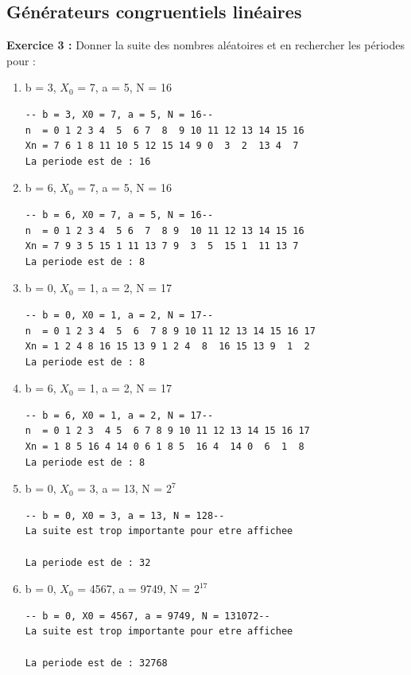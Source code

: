 \documentclass[oneside]{book}
\begin{document}
\subsection{Générateurs congruentiels linéaires}
\textbf{Exercice 3 :}
Donner la suite des nombres aléatoires et en rechercher les périodes pour : 
\begin{enumerate}
	\item b = 3, $X_0$ = 7, a = 5, N = 16 
	\begin{lstlisting}[frame=single]
	-- b = 3, X0 = 7, a = 5, N = 16--
n  = 0 1 2 3 4  5  6 7  8  9 10 11 12 13 14 15 16 
Xn = 7 6 1 8 11 10 5 12 15 14 9 0  3  2  13 4  7 
La periode est de : 16
\end{lstlisting}
	\item b = 6, $X_0$ = 7, a = 5, N = 16 
	\begin{lstlisting}[frame=single]
	-- b = 6, X0 = 7, a = 5, N = 16--
n  = 0 1 2 3 4  5 6  7  8 9  10 11 12 13 14 15 16 
Xn = 7 9 3 5 15 1 11 13 7 9  3  5  15 1  11 13 7 
La periode est de : 8

	\end{lstlisting}
	\item b = 0, $X_0$ = 1, a = 2, N = 17 
	\begin{lstlisting}[frame=single]
	-- b = 0, X0 = 1, a = 2, N = 17--
n  = 0 1 2 3 4  5  6  7 8 9 10 11 12 13 14 15 16 17 
Xn = 1 2 4 8 16 15 13 9 1 2 4  8  16 15 13 9  1  2 
La periode est de : 8
	\end{lstlisting}
	\item b = 6, $X_0$ = 1, a = 2, N = 17 
	\begin{lstlisting}[frame=single]
	-- b = 6, X0 = 1, a = 2, N = 17--
n  = 0 1 2 3  4 5  6 7 8 9 10 11 12 13 14 15 16 17 
Xn = 1 8 5 16 4 14 0 6 1 8 5  16 4  14 0  6  1  8 
La periode est de : 8

	\end{lstlisting}
	\item b = 0, $X_0$ = 3, a = 13, N = $2^7$ 
	\begin{lstlisting}[frame=single]
	-- b = 0, X0 = 3, a = 13, N = 128--
La suite est trop importante pour etre affichee

La periode est de : 32

	\end{lstlisting}
	\item b = 0, $X_0$ = 4567, a = 9749, N = $2^{17}$
	\begin{lstlisting}[frame=single]
	-- b = 0, X0 = 4567, a = 9749, N = 131072--
La suite est trop importante pour etre affichee

La periode est de : 32768
    \end{lstlisting}
\end{enumerate}
\end{document}
